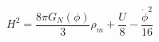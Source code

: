 \begin{equation}
H^2= \frac{8\pi G_N(\phi)}{3}\rho_m +\frac{U}{8}-\frac{\dot \phi^2}{16}
\end{equation}

